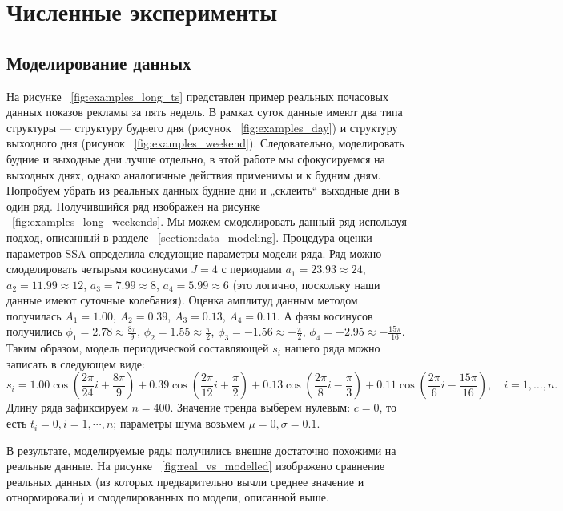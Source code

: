 \documentclass[%
12pt,
master,  %
natbib,      %
subf,        %
substylefile = spbu.rtx,
href,        %
colorlinks,  %
]{disser}
\begin{document}
\chapter{Численные эксперименты}


\section{Моделирование данных}

На рисунке ~\ref{fig:examples_long_ts} представлен пример реальных почасовых данных показов рекламы за пять недель. В рамках суток данные имеют два типа структуры --- структуру буднего дня (рисунок ~\ref{fig:examples_day}) и структуру выходного дня (рисунок ~\ref{fig:examples_weekend}). Следовательно, моделировать будние и выходные дни лучше отдельно, в этой работе мы сфокусируемся на выходных днях, однако аналогичные действия применимы и к будним дням. Попробуем убрать из реальных данных будние дни и „склеить“ выходные дни в один ряд. Получившийся ряд изображен на рисунке ~\ref{fig:examples_long_weekends}.
Мы можем смоделировать данный ряд используя подход, описанный в разделе ~\ref{section:data_modeling}. 
Процедура оценки параметров SSA определила следующие параметры модели ряда. Ряд можно смоделировать четырьмя косинусами $J=4$ с периодами $a_1 = 23.93 \approx 24$, $a_2 = 11.99 \approx 12$, $a_3 = 7.99 \approx 8$, $a_4 = 5.99 \approx 6$ (это логично, поскольку наши данные имеют суточные колебания). Оценка амплитуд данным методом получилась $A_1 = 1.00$, $A_2 = 0.39$, $A_3 = 0.13$, $A_4 = 0.11$. А фазы косинусов получились $\phi_1 = 2.78 \approx \frac{8\pi}{9}$, $\phi_2 = 1.55 \approx \frac{\pi}{2}$, $\phi_3 = -1.56 \approx -\frac{\pi}{2}$, $\phi_4 = -2.95 \approx -\frac{15\pi}{16}$. Таким образом, модель периодической составляющей $s_i$ нашего ряда можно записать в следующем виде:
\begin{equation*}
s_i = 1.00\cos(\frac{2\pi}{24}i + \frac{8\pi}{9}) + 
                    0.39\cos(\frac{2\pi}{12}i + \frac{\pi}{2}) + 
                    0.13\cos(\frac{2\pi}{8}i - \frac{\pi}{3}) + 
                    0.11\cos(\frac{2\pi}{6}i - \frac{15\pi}{16}), \quad i = 1, \dots, n.
\end{equation*}
Длину ряда зафиксируем $n = 400$. Значение тренда выберем нулевым: $c = 0$, то есть $t_i = 0, i = 1,\cdots, n$; параметры шума возьмем $\mu = 0, \sigma = 0.1$.

В результате, моделируемые ряды получились внешне достаточно похожими на реальные данные. На рисунке ~\ref{fig:real_vs_modelled} изображено сравнение реальных данных (из которых предварительно вычли среднее значение и отнормировали) и смоделированных по модели, описанной выше.
\end{document}
